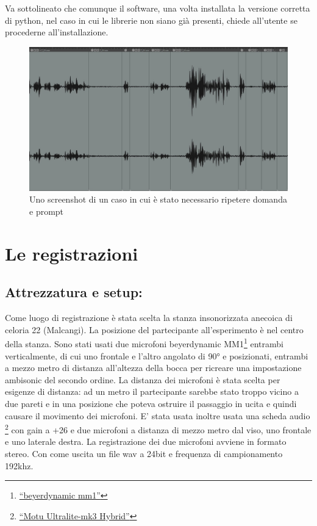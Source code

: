 \documentclass[
]{article}
\begin{document}
Va sottolineato che comunque il software, una volta installata la versione corretta di python, nel caso in cui le librerie non siano già presenti, chiede all'utente se procederne all'installazione.

\begin{figure}
\centering
\includegraphics{img/1.jpg}
\caption{Uno screenshot di un caso in cui è stato necessario ripetere domanda e prompt}
\end{figure}

\section{Le registrazioni}\label{le-registrazioni}

\subsection{Attrezzatura e setup:}\label{attrezzatura-e-setup}

Come luogo di registrazione è stata scelta la stanza insonorizzata anecoica di celoria 22 (Malcangi). La posizione del partecipante all'esperimento è nel centro della stanza. Sono stati usati due microfoni beyerdynamic MM1\footnote{\href{beyerdynamic\%20mm1}{``beyerdynamic mm1''}} entrambi verticalmente, di cui uno frontale e l'altro angolato di 90° e posizionati, entrambi a mezzo metro di distanza all'altezza della bocca per ricreare una impostazione ambisonic del secondo ordine. La distanza dei microfoni è stata scelta per esigenze di distanza: ad un metro il partecipante sarebbe stato troppo vicino a due pareti e in una posizione che poteva ostruire il passaggio in ucita e quindi causare il movimento dei microfoni. E' stata usata inoltre usata una scheda audio \footnote{\href{https://motu.com/products/motuaudio/ultralite-mk3/i-o.html}{``Motu Ultralite-mk3 Hybrid''}} con gain a +26 e due microfoni a distanza di mezzo metro dal viso, uno frontale e uno laterale destra. La registrazione dei due microfoni avviene in formato stereo. Con come uscita un file wav a 24bit e frequenza di campionamento 192khz.
\end{document}
